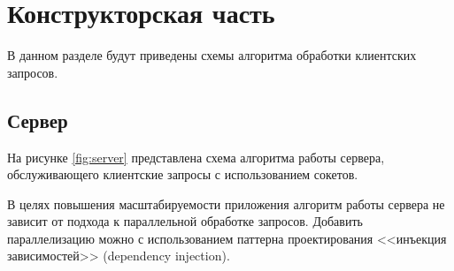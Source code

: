 \section{Конструкторская часть}
В данном разделе будут приведены схемы алгоритма обработки клиентских запросов.
\subsection{Сервер}
На рисунке \ref{fig:server} представлена схема алгоритма работы сервера, обслуживающего клиентские запросы с использованием сокетов.

В целях повышения масштабируемости приложения алгоритм работы сервера не зависит от подхода к параллельной обработке запросов. Добавить параллелизацию можно с использованием паттерна проектирования <<инъекция зависимостей>> (dependency injection).

